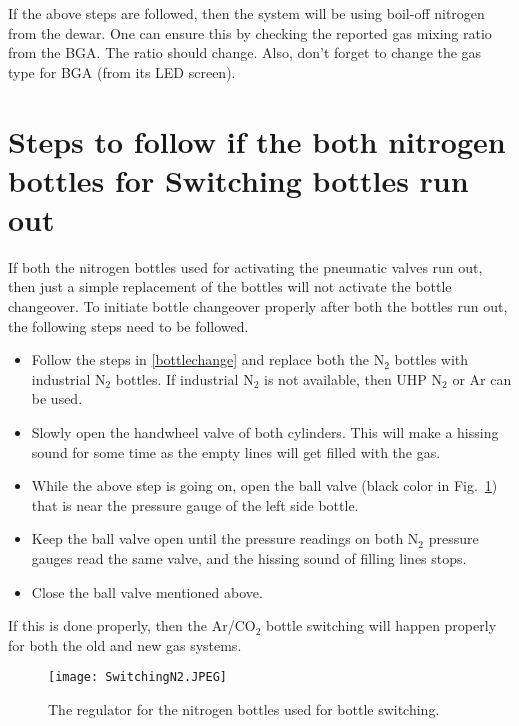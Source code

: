 If the above steps are followed, then the system will be using boil-off nitrogen from the dewar. One can
ensure this by checking the reported gas mixing ratio from the BGA. The ratio should change. Also, don't forget to change the gas type for BGA (from its LED screen).
\section{Steps to follow if the both nitrogen bottles for Switching bottles run out}
If both the nitrogen bottles used for activating the pneumatic valves run out, then just a simple replacement
of the bottles will not activate the bottle changeover. To initiate bottle changeover properly after both the bottles
run out, the following steps need to be followed.
\begin{itemize}
\item Follow the steps in \ref{bottlechange} and replace both the N$_2$ bottles with industrial N$_2$ bottles. If industrial N$_2$ is not available, then UHP N$_2$ or Ar can be used.
\item Slowly open the handwheel valve of both cylinders. This will make a hissing sound for some time as the empty lines will get filled with the gas.
\item While the above step is going on, open the ball valve (black color in Fig.~\ref{fig:BottleSwitching}) that is near the pressure gauge of the left side bottle.
\item Keep the ball valve open until the pressure readings on both N$_2$ pressure gauges read the same valve, and the hissing sound of filling lines stops.
\item Close the ball valve mentioned above.
\end{itemize}

If this is done properly, then the Ar/CO$_2$ bottle switching will happen properly for both the old and new gas systems.

\begin{figure}[h!]
\begin{center}
\texttt{[image: SwitchingN2.JPEG]}
\caption{The regulator for the nitrogen bottles used for bottle switching.}
\label{fig:BottleSwitching}
\end{center}
\end{figure}


